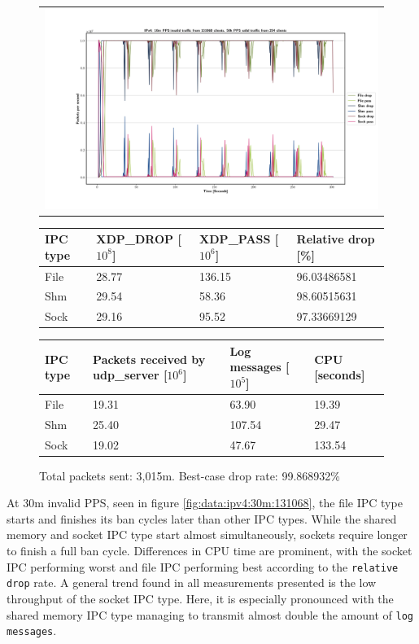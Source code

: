 \begin{figure}[!h]
	\centering
	\scriptsize
	\begin{tabular}{c}
    	\centerline{\includegraphics[width=1.2\textwidth]{images/IPv4_10m_131068_1.png}}
	\end{tabular}
	\begin{tabular}{llll}
		\toprule
		\textbf{IPC type} & \textbf{XDP\_DROP [$10^8$]} & \textbf{XDP\_PASS [$10^6$]} & \textbf{Relative drop [\%]} \\ \midrule 
		File & 28.77 & 136.15 & 96.03486581 \\
        Shm & 29.54 & 58.36 & 98.60515631 \\
        Sock & 29.16 & 95.52 & 97.33669129 \\
	\bottomrule
	\end{tabular}
    \begin{tabular}{llll}
		\toprule
		\textbf{IPC type} & \textbf{Packets received by udp\_server [$10^6$]} & \textbf{Log messages [$10^5$]} & \textbf{CPU [seconds]} \\ \midrule 
		File & 19.31 & 63.90 & 19.39 \\
        Shm & 25.40 & 107.54 & 29.47 \\
        Sock & 19.02 & 47.67 & 133.54 \\
	\bottomrule
	\end{tabular}
	\caption[Simplefail2ban, IPv4, 10m \ac{PPS}, 131,068 malicious clients]{Total packets sent: 3,015m. Best-case drop rate: 99.868932\%}
	\label{fig:data:ipv4:10m:131068}
\end{figure}

At 30m invalid \ac{PPS}, seen in figure \ref{fig:data:ipv4:30m:131068}, the file \ac{IPC} type starts and finishes its ban cycles later than other \ac{IPC} types.
While the shared memory and socket \ac{IPC} type start almost simultaneously, sockets require longer to finish a full ban cycle.
Differences in \ac{CPU} time are prominent, with the socket \ac{IPC} performing worst and file \ac{IPC} performing best according to the \texttt{relative drop} rate.
A general trend found in all measurements presented is the low throughput of the socket \ac{IPC} type.
Here, it is especially pronounced with the shared memory \ac{IPC} type managing to transmit almost double the amount of \texttt{log messages}.

